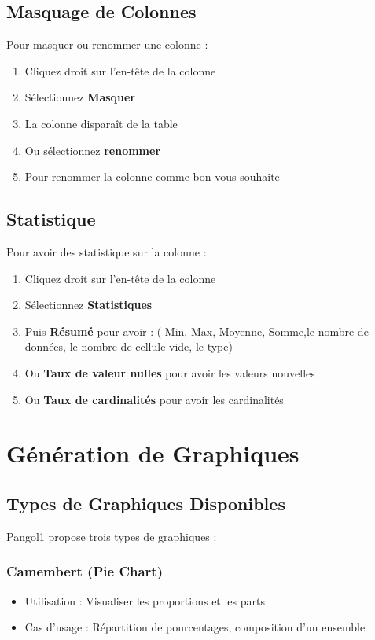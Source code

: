 \documentclass[11pt, a4paper]{article}
\begin{document}
\subsection{Masquage de Colonnes}
Pour masquer ou renommer une colonne :

\begin{enumerate}
    \item Cliquez droit sur l'en-tête de la colonne
    \item Sélectionnez \textbf{Masquer}
    \item La colonne disparaît de la table
    \item Ou sélectionnez \textbf{renommer}
    \item Pour renommer la colonne comme bon vous souhaite
\end{enumerate}

\subsection{Statistique}
Pour avoir des statistique sur la colonne :

\begin{enumerate}
    \item Cliquez droit sur l'en-tête de la colonne
    \item Sélectionnez \textbf{Statistiques}
    \item Puis \textbf{Résumé} pour avoir : ( Min, Max, Moyenne, Somme,le nombre de données, le nombre de cellule vide, le type)
    \item Ou \textbf{Taux de valeur nulles} pour avoir les valeurs nouvelles
    \item Ou \textbf{Taux de cardinalités} pour avoir les cardinalités
\end{enumerate}

\section{Génération de Graphiques}

\subsection{Types de Graphiques Disponibles}
Pangol1 propose trois types de graphiques :

\subsubsection{Camembert (Pie Chart)}
\begin{itemize}
    \item Utilisation : Visualiser les proportions et les parts
    \item Cas d'usage : Répartition de pourcentages, composition d'un ensemble
\end{itemize}
\end{document}
